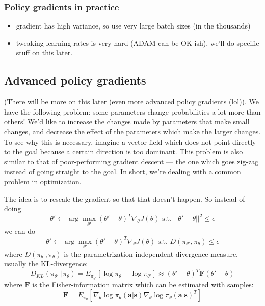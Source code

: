 \documentclass{report}
\newcommand{\argmax}{\arg\!\max}
\begin{document}
\subsubsection{Policy gradients in practice}
\begin{itemize}
		\item gradient has high variance, so use very large batch sizes (in the thousands)
		\item tweaking learning rates is very hard (ADAM can be OK-ish), we'll do specific stuff on this later.
\end{itemize}

\subsection{Advanced policy gradients}
(There will be more on this later (even more advanced policy gradients (lol)).
We have the following problem: some parameters change probabilities a lot more than others!
We'd like to increase the changes made by parameters that make small changes, and decrease
the effect of the parameters which make the larger changes.
To see why this is necessary, imagine a vector field which does not point directly to the goal because
a certain direction is too dominant.
This problem is also similar to that of poor-performing gradient descent --- the one which goes zig-zag instead of going
straight to the goal. In short, we're dealing with a common problem in optimization.

The idea is to rescale the gradient so that that doesn't happen.
So instead of doing
\begin{equation}
		\theta' \leftarrow \argmax_{\theta'} (\theta' - \theta)^T \nabla_{\theta}J(\theta) \text{ s.t. } ||\theta' - \theta||^2 \leq \epsilon
\end{equation}
we can do
\begin{equation}
		\theta' \leftarrow \argmax_{\theta'} (\theta' - \theta)^T \nabla_{\theta}J(\theta) \text{ s.t. } D(\pi_{\theta'}, \pi_\theta) \leq \epsilon
\end{equation}
where $D(\pi_{\theta'}, \pi_\theta)$ is the parametrization-independent divergence measure.
usually the KL-divergence:
\begin{equation}
		D_{KL} (\pi_{\theta'}||\pi_\theta) = E_{\pi_{\theta'}} \left[ \log \pi_\theta - \log \pi_{\theta'} \right]  
		\approx (\theta' - \theta)^T \bm{F} (\theta' - \theta)
\end{equation}
where $\bm{F}$ is the Fisher-information matrix which can be estimated with samples:
\begin{equation}
		\bm{F} = E_{\pi_{\theta}} \left[ \nabla_{\theta} \log \pi_\theta(\bm{a}|\bm{s}) \nabla_{\theta} \log \pi_\theta(\bm{a}|\bm{s})^T \right] 
\end{equation}
\end{document}
